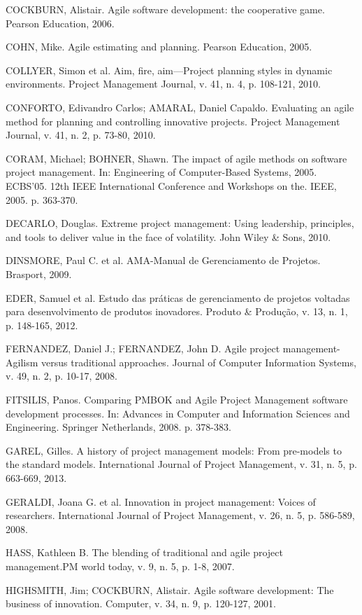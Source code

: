 COCKBURN, Alistair. Agile software development: the cooperative game. Pearson Education, 2006.

COHN, Mike. Agile estimating and planning. Pearson Education, 2005.

COLLYER, Simon et al. Aim, fire, aim—Project planning styles in dynamic environments. Project Management Journal, v. 41, n. 4, p. 108-121, 2010.

CONFORTO, Edivandro Carlos; AMARAL, Daniel Capaldo. Evaluating an agile method for planning and controlling innovative projects. Project Management Journal, v. 41, n. 2, p. 73-80, 2010.

CORAM, Michael; BOHNER, Shawn. The impact of agile methods on software project management. In: Engineering of Computer-Based Systems, 2005. ECBS'05. 12th IEEE International Conference and Workshops on the. IEEE, 2005. p. 363-370.

DECARLO, Douglas. Extreme project management: Using leadership, principles, and tools to deliver value in the face of volatility. John Wiley \& Sons, 2010.

DINSMORE, Paul C. et al. AMA-Manual de Gerenciamento de Projetos. Brasport, 2009.

EDER, Samuel et al. Estudo das práticas de gerenciamento de projetos voltadas para desenvolvimento de produtos inovadores. Produto \& Produção, v. 13, n. 1, p. 148-165, 2012.

FERNANDEZ, Daniel J.; FERNANDEZ, John D. Agile project management-Agilism versus traditional approaches. Journal of Computer Information Systems, v. 49, n. 2, p. 10-17, 2008.

FITSILIS, Panos. Comparing PMBOK and Agile Project Management software development processes. In: Advances in Computer and Information Sciences and Engineering. Springer Netherlands, 2008. p. 378-383.

GAREL, Gilles. A history of project management models: From pre-models to the standard models. International Journal of Project Management, v. 31, n. 5, p. 663-669, 2013.

GERALDI, Joana G. et al. Innovation in project management: Voices of researchers. International Journal of Project Management, v. 26, n. 5, p. 586-589, 2008.

HASS, Kathleen B. The blending of traditional and agile project management.PM world today, v. 9, n. 5, p. 1-8, 2007.

HIGHSMITH, Jim; COCKBURN, Alistair. Agile software development: The business of innovation. Computer, v. 34, n. 9, p. 120-127, 2001.

